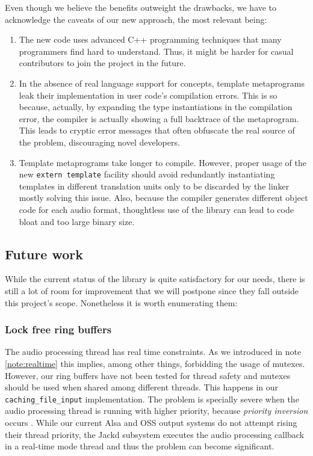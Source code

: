 Even though we believe the benefits outweight the drawbacks, we have
to acknowledge the caveats of our new approach, the most relevant
being:
\begin{enumerate}
\item The new code uses advanced C++ programming techniques that many
  programmers find hard to understand. Thus, it might be harder for
  casual contributors to join the project in the future.

\item In the absence of real language support for concepts, template
  metaprograms leak their implementation in user code's compilation
  errors. This is so because, actually, by expanding the type
  instantiations in the compilation error, the compiler is actually
  showing a full backtrace of the metaprogram. This leads to cryptic
  error messages that often obfuscate the real source of the problem,
  discouraging novel developers.

\item Template metaprograms take longer to compile. However, proper
  usage of the new \texttt{extern template} facility should avoid
  redundantly instantiating templates in different translation units
  only to be discarded by the linker mostly solving this issue. Also,
  because the compiler generates different object code for each audio
  format, thoughtless use of the library can lead to code bloat and
  too large binary size.
\end{enumerate}

\subsection{Future work}

While the current status of the library is quite satisfactory for our
needs, there is still a lot of room for improvement that we will
postpone since they fall outside this project's scope. Nonetheless it
is worth enumerating them:

\subsubsection{Lock free ring buffers}
\label{sec:fixringbuffer}

The audio processing thread has real time constraints. As we
introduced in note \ref{note:realtime} this implies, among other
things, forbidding the usage of mutexes. However, our ring buffers
have not been tested for thread safety and mutexes should be used when
shared among different threads. This happens in our
\texttt{caching\_file\_input} implementation. The problem is specially
severe when the audio processing thread is running with higher
priority, because \emph{priority inversion} occurs
\cite{kim03basic}. While our current Alsa and OSS output systems do
not attempt rising their thread priority, the Jackd subsystem executes
the audio processing callback in a real-time mode thread and thus the
problem can become significant.

